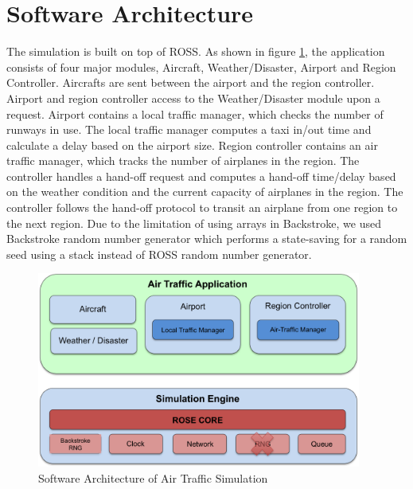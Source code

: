 \section {Software Architecture}

The simulation is built on top of ROSS. 
As shown in figure \ref{fig:software}, the application consists of four major modules, Aircraft, Weather/Disaster, Airport and Region Controller. 
Aircrafts are sent between the airport and the region controller. Airport and region controller access to the Weather/Disaster module upon a request. 
Airport contains a local traffic manager, which checks the number of runways in use. 
The local traffic manager computes a taxi in/out time and calculate a delay based on the airport size.
Region controller contains an air traffic manager, which tracks the number of airplanes in the region.
The controller handles a hand-off request and computes a hand-off time/delay based on the weather condition and the current capacity of airplanes in the region. 
The controller follows the hand-off protocol to transit an airplane from one region to the next region.  
Due to the limitation of using arrays in Backstroke, we used Backstroke random number generator which performs a state-saving for a random seed using a stack instead of ROSS random number generator.


\begin{figure} [htd]
\centering
\includegraphics[width=4.2in]{figs/software.png}
\caption{Software Architecture of Air Traffic Simulation}
\label{fig:software}
\end{figure}
